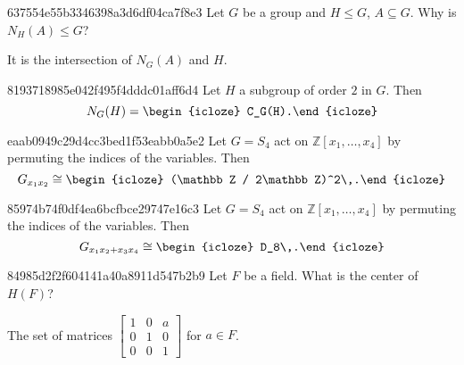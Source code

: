 \begin{note}{637554e55b3346398a3d6df04ca7f8e3}
    Let \({ G }\) be a group and \({ H \leq G }\), \({ A \subseteq G }\).
    Why is \({ N_H(A) \leq G }\)?

    \begin{cloze}{1}
        It is the intersection of \({ N_G(A) }\) and \({ H }\).
    \end{cloze}
\end{note}

\begin{note}{8193718985e042f495f4dddc01aff6d4}
    Let \({ H }\) a subgroup of order \({ 2 }\) in \({ G }\).
    Then
    \[
        N_G(H) = \begin{icloze}{1}C_G(H).\end{icloze}
    \]
\end{note}

\begin{note}{eaab0949c29d4cc3bed1f53eabb0a5e2}
    Let \({ G = S_4 }\) act on \({ \mathbb Z[x_1, \ldots, x_4] }\) by permuting the indices of the variables.
    Then
    \[
        G_{x_1x_2} \cong \begin{icloze}{1}(\mathbb Z / 2\mathbb Z)^2\,.\end{icloze}
    \]
\end{note}

\begin{note}{85974b74f0df4ea6bcfbce29747e16c3}
    Let \({ G = S_4 }\) act on \({ \mathbb Z[x_1, \ldots, x_4] }\) by permuting the indices of the variables.
    Then
    \[
        G_{x_1x_2 + x_3x_4} \cong \begin{icloze}{1}D_8\,.\end{icloze}
    \]
\end{note}

\begin{note}{84985d2f2f604141a40a8911d547b2b9}
    Let \({ F }\) be a field.
    What is the center of \({ H(F) }\)?

    \begin{cloze}{1}
        The set of matrices
        \({
            \begin{bmatrix}
                1 & 0 & a \\
                0 & 1 & 0 \\
                0 & 0 & 1
            \end{bmatrix}
        }\)
        for \({ a \in F }\).
    \end{cloze}
\end{note}

